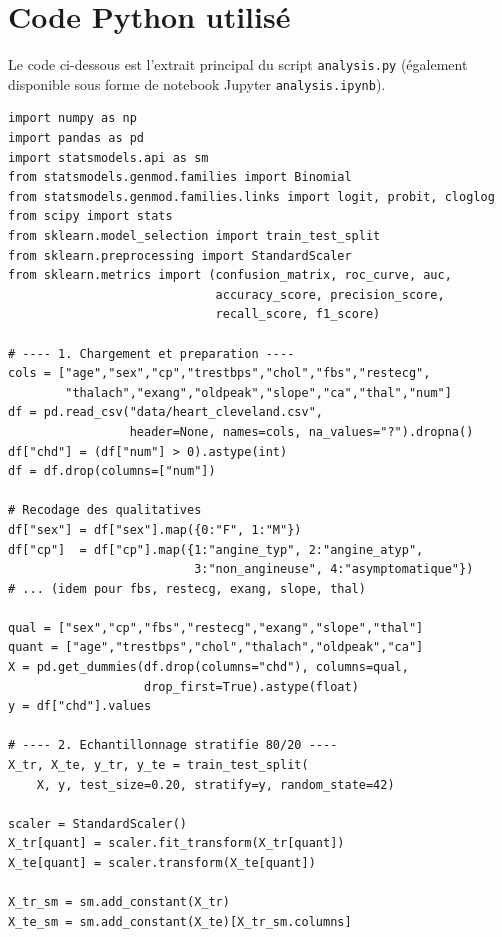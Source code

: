 \documentclass[11pt,a4paper,twoside]{report}
\theoremstyle{definition}
\begin{document}
\appendix
\chapter{Code Python utilisé}

Le code ci-dessous est l'extrait principal du script \texttt{analysis.py}
(également disponible sous forme de notebook Jupyter
\texttt{analysis.ipynb}).

\begin{lstlisting}[caption={Pipeline complet d'analyse par GLM logistique},label={lst:analysis}]
import numpy as np
import pandas as pd
import statsmodels.api as sm
from statsmodels.genmod.families import Binomial
from statsmodels.genmod.families.links import logit, probit, cloglog
from scipy import stats
from sklearn.model_selection import train_test_split
from sklearn.preprocessing import StandardScaler
from sklearn.metrics import (confusion_matrix, roc_curve, auc,
                             accuracy_score, precision_score,
                             recall_score, f1_score)

# ---- 1. Chargement et preparation ----
cols = ["age","sex","cp","trestbps","chol","fbs","restecg",
        "thalach","exang","oldpeak","slope","ca","thal","num"]
df = pd.read_csv("data/heart_cleveland.csv",
                 header=None, names=cols, na_values="?").dropna()
df["chd"] = (df["num"] > 0).astype(int)
df = df.drop(columns=["num"])

# Recodage des qualitatives
df["sex"] = df["sex"].map({0:"F", 1:"M"})
df["cp"]  = df["cp"].map({1:"angine_typ", 2:"angine_atyp",
                          3:"non_angineuse", 4:"asymptomatique"})
# ... (idem pour fbs, restecg, exang, slope, thal)

qual = ["sex","cp","fbs","restecg","exang","slope","thal"]
quant = ["age","trestbps","chol","thalach","oldpeak","ca"]
X = pd.get_dummies(df.drop(columns="chd"), columns=qual,
                   drop_first=True).astype(float)
y = df["chd"].values

# ---- 2. Echantillonnage stratifie 80/20 ----
X_tr, X_te, y_tr, y_te = train_test_split(
    X, y, test_size=0.20, stratify=y, random_state=42)

scaler = StandardScaler()
X_tr[quant] = scaler.fit_transform(X_tr[quant])
X_te[quant] = scaler.transform(X_te[quant])

X_tr_sm = sm.add_constant(X_tr)
X_te_sm = sm.add_constant(X_te)[X_tr_sm.columns]


\end{lstlisting}
\end{document}
